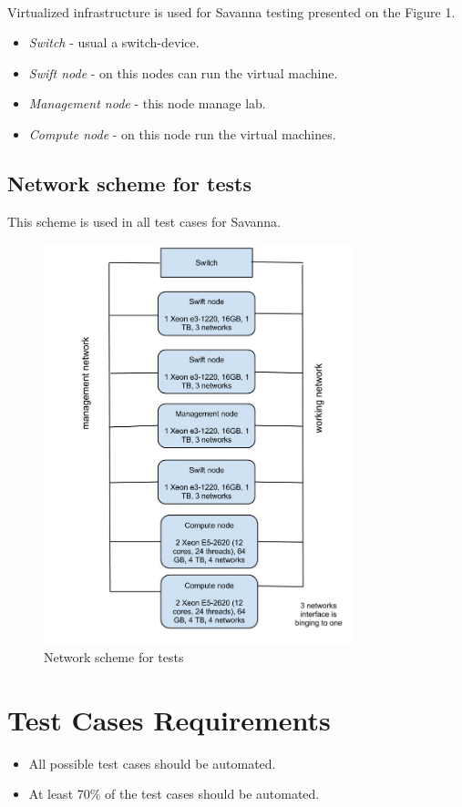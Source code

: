 \documentclass[a4paper,11pt]{article}
\begin{document}
\paragraph{} Virtualized infrastructure is used for Savanna testing presented on the Figure 1.
\begin{itemize}
\item \textit{Switch} - usual a switch-device.
\item \textit{Swift node} - on this nodes can run the virtual machine.
\item \textit{Management node} - this node manage lab.
\item \textit{Compute node} - on this node run the virtual machines.
\end{itemize}

\subsection{Network scheme for tests}
This scheme is used in all test cases for Savanna.

\begin{figure}[hb]
\caption{Network scheme for tests}
 \begin{center}
  \includegraphics[width=9cm]{HadoopLabSchema.jpg}
 \end{center}
\label{fig:MainScheme}
\end{figure}



\section{Test Cases Requirements}

\begin{itemize}
\item All possible test cases should be automated.
\item At least 70\% of the test cases should be automated.
\end{itemize}
\end{document}
